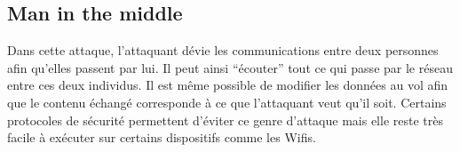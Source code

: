 \documentclass[article, french]{yReport}
\begin{document}
	\subsection{Man in the middle}
	Dans cette attaque, l'attaquant dévie les communications entre deux personnes afin qu'elles passent par lui.
	Il peut ainsi \enquote{écouter} tout ce qui passe par le réseau entre ces deux individus.
	Il est même possible de modifier les données au vol afin que le contenu échangé corresponde à ce que l'attaquant veut qu'il soit.
	Certains protocoles de sécurité permettent d'éviter ce genre d'attaque mais elle reste très facile à exécuter sur certains dispositifs comme les Wifis.
	
\end{document}
